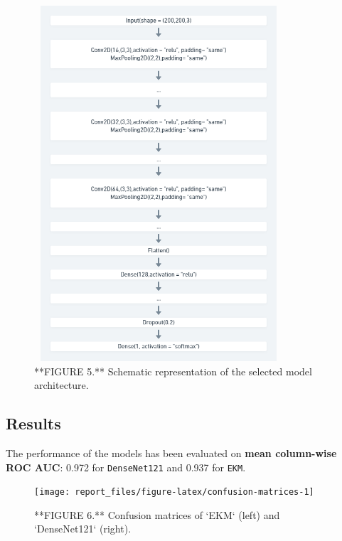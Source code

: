 \documentclass[]{article}
\begin{document}
\begin{figure}

{\centering \includegraphics[width=350px,height=500]{Images/BaseNetShort} 

}

\caption{**FIGURE 5.** Schematic representation of the selected model architecture.}\label{fig:basenet}
\end{figure}

\hypertarget{results}{%
\subsection{\texorpdfstring{\textbf{Results}}{Results}}\label{results}}

The performance of the models has been evaluated on \textbf{mean
column-wise ROC AUC}: 0.972 for \texttt{DenseNet121} and 0.937 for
\texttt{EKM}.

\begin{figure}

{\centering \texttt{[image: report\_files/figure-latex/confusion-matrices-1]} 

}

\caption{**FIGURE 6.** Confusion matrices of `EKM` (left) and `DenseNet121` (right).}\label{fig:confusion-matrices}
\end{figure}
\end{document}
